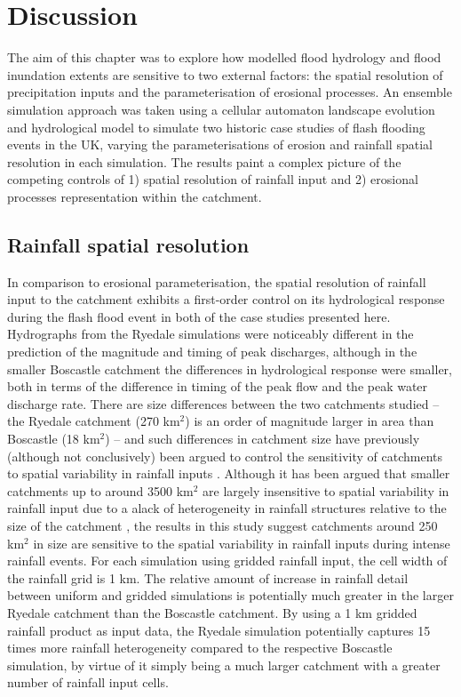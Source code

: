 \section{Discussion}

The aim of this chapter was to explore how modelled flood hydrology and flood inundation extents are sensitive to two external factors: the spatial resolution of precipitation inputs and the parameterisation of erosional processes. An ensemble simulation approach was taken using a cellular automaton landscape evolution and hydrological model to simulate two historic case studies of flash flooding events in the UK, varying the parameterisations of erosion and rainfall spatial resolution in each simulation. The results paint a complex picture of the competing controls of 1) spatial resolution of rainfall input and 2) erosional processes representation within the catchment.

\subsection{Rainfall spatial resolution}
In comparison to erosional parameterisation, the spatial resolution of rainfall input to the catchment exhibits a first-order control on its hydrological response during the flash flood event in both of the case studies presented here. Hydrographs from the Ryedale simulations were noticeably different in the prediction of the magnitude and timing of peak discharges, although in the smaller Boscastle catchment the differences in hydrological response were smaller, both in terms of the difference in timing of the peak flow and the peak water discharge rate. There are size differences between the two catchments studied -- the Ryedale catchment (270 km\(^2\)) is an order of magnitude larger in area than Boscastle (18 km\(^2\)) -- and such differences in catchment size have previously (although not conclusively) been argued to control the sensitivity of catchments to spatial variability in rainfall inputs \citep{krajewski1991monte,nicotina2008impact}. Although it has been argued that smaller catchments up to around 3500 km\(^2\) are largely insensitive to spatial variability in rainfall input due to a alack of heterogeneity in rainfall structures relative to the size of the catchment  \citep{nicotina2008impact}, the results in this study suggest catchments around 250 km\(^2\) in size are sensitive to the spatial variability in rainfall inputs during intense rainfall events. For each simulation using gridded rainfall input, the cell width of the rainfall grid is 1 km. The relative amount of increase in rainfall detail between uniform and gridded simulations is potentially much greater in the larger Ryedale catchment than the Boscastle catchment. By using a 1 km gridded rainfall product as input data, the Ryedale simulation potentially captures 15 times more rainfall heterogeneity compared to the respective Boscastle simulation, by virtue of it simply being a much larger catchment with a greater number of rainfall input cells. 

